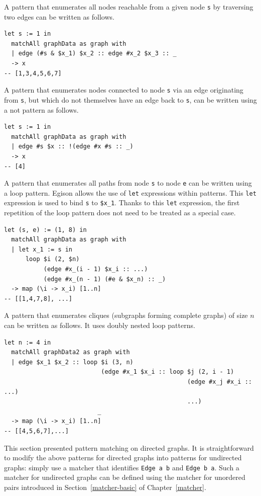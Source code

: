 A pattern that enumerates all nodes reachable from a given node \lstinline{s} by traversing two edges can be written as follows.
\begin{lstlisting}[language=egison,numbers=none]
let s := 1 in
  matchAll graphData as graph with
  | edge (#s & $x_1) $x_2 :: edge #x_2 $x_3 :: _
  -> x
-- [1,3,4,5,6,7]
\end{lstlisting}
A pattern that enumerates nodes connected to node \lstinline{s} via an edge originating from \lstinline{s}, but which do not themselves have an edge back to \lstinline{s}, can be written using a not pattern as follows.
\begin{lstlisting}[language=egison,numbers=none]
let s := 1 in
  matchAll graphData as graph with
  | edge #s $x :: !(edge #x #s :: _)
  -> x
-- [4]
\end{lstlisting}
A pattern that enumerates all paths from node \lstinline{s} to node \lstinline{e} can be written using a loop pattern.
Egison allows the use of \lstinline{let} expressions within patterns.
This \lstinline{let} expression is used to bind \lstinline{s} to \lstinline{$x_1}.
Thanks to this \lstinline{let} expression, the first repetition of the loop pattern does not need to be treated as a special case.
\begin{lstlisting}[language=egison,numbers=none]
let (s, e) := (1, 8) in
  matchAll graphData as graph with
  | let x_1 := s in
      loop $i (2, $n)
           (edge #x_(i - 1) $x_i :: ...)
           (edge #x_(n - 1) (#e & $x_n) :: _)
  -> map (\i -> x_i) [1..n]
-- [[1,4,7,8], ...]
\end{lstlisting}
A pattern that enumerates cliques (subgraphs forming complete graphs) of size $n$ can be written as follows.
It uses doubly nested loop patterns.
\begin{lstlisting}[language=egison,numbers=none]
let n := 4 in
  matchAll graphData2 as graph with
  | edge $x_1 $x_2 :: loop $i (3, n)
                           (edge #x_1 $x_i :: loop $j (2, i - 1)
                                                   (edge #x_j #x_i :: ...)
                                                   ...)
                          _
  -> map (\i -> x_i) [1..n]
-- [[4,5,6,7],...]
\end{lstlisting}

This section presented pattern matching on directed graphs.
It is straightforward to modify the above patterns for directed graphs into patterns for undirected graphs: simply use a matcher that identifies \lstinline{Edge a b} and \lstinline{Edge b a}.
Such a matcher for undirected graphs can be defined using the matcher for unordered pairs introduced in Section~\ref{matcher-basic} of Chapter~\ref{matcher}.

